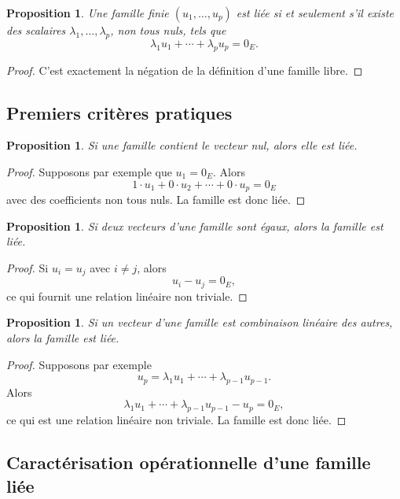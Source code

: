 \documentclass[11pt,a4paper]{article}
\newtheorem{proposition}[definition]{Proposition}
\theoremstyle{remark}
\begin{document}
\begin{proposition}
Une famille finie \((u_1,\dots,u_p)\) est liée si et seulement s’il existe des scalaires \(\lambda_1,\dots,\lambda_p\), non tous nuls, tels que
\[
\lambda_1u_1+\cdots+\lambda_pu_p=0_E.
\]
\end{proposition}

\begin{proof}
C’est exactement la négation de la définition d’une famille libre.
\end{proof}

\subsection{Premiers critères pratiques}

\begin{proposition}
Si une famille contient le vecteur nul, alors elle est liée.
\end{proposition}

\begin{proof}
Supposons par exemple que \(u_1=0_E\). Alors
\[
1\cdot u_1+0\cdot u_2+\cdots+0\cdot u_p=0_E
\]
avec des coefficients non tous nuls. La famille est donc liée.
\end{proof}

\begin{proposition}
Si deux vecteurs d’une famille sont égaux, alors la famille est liée.
\end{proposition}

\begin{proof}
Si \(u_i=u_j\) avec \(i\neq j\), alors
\[
u_i-u_j=0_E,
\]
ce qui fournit une relation linéaire non triviale.
\end{proof}

\begin{proposition}
Si un vecteur d’une famille est combinaison linéaire des autres, alors la famille est liée.
\end{proposition}

\begin{proof}
Supposons par exemple
\[
u_p=\lambda_1u_1+\cdots+\lambda_{p-1}u_{p-1}.
\]
Alors
\[
\lambda_1u_1+\cdots+\lambda_{p-1}u_{p-1}-u_p=0_E,
\]
ce qui est une relation linéaire non triviale. La famille est donc liée.
\end{proof}

\subsection{Caractérisation opérationnelle d’une famille liée}
\end{document}

